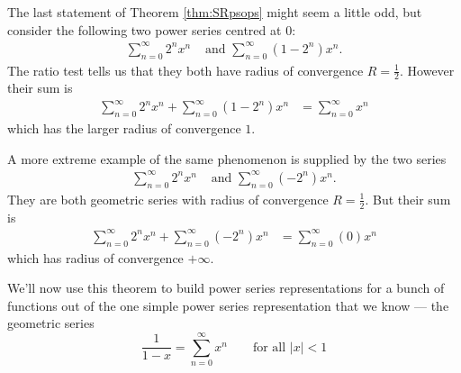 \begin{eg}
The last statement of Theorem \ref{thm:SRpsops} might seem a little odd,
but consider the following two power series centred at $0$:
\begin{align*}
  \sum_{n=0}^\infty 2^n x^n & \text{ and } \sum_{n=0}^\infty (1-2^n) x^n.
\end{align*}
The ratio test tells us that they both have radius of convergence $R=\frac{1}{2}$. However their sum is
\begin{align*}
  \sum_{n=0}^\infty 2^n x^n + \sum_{n=0}^\infty (1-2^n) x^n
  &= \sum_{n=0}^\infty x^n
\end{align*}
which has the larger radius of convergence $1$.

A more extreme example of the same phenomenon is supplied by the two series
\begin{align*}
  \sum_{n=0}^\infty 2^n x^n & \text{ and } \sum_{n=0}^\infty (-2^n) x^n.
\end{align*}
They are both geometric series with radius of convergence $R=\frac{1}{2}$.
But their sum is
\begin{align*}
  \sum_{n=0}^\infty 2^n x^n + \sum_{n=0}^\infty (-2^n) x^n
  &= \sum_{n=0}^\infty (0)x^n
\end{align*}
which has radius of convergence $+\infty$.
\end{eg}

We'll now use this theorem to build power series representations
for a bunch of functions out of the one simple power
series representation that we know --- the geometric series
\begin{equation*}
\frac{1}{1-x} = \sum_{n=0}^\infty x^n\qquad \text{for all $|x|<1$}
\end{equation*}

